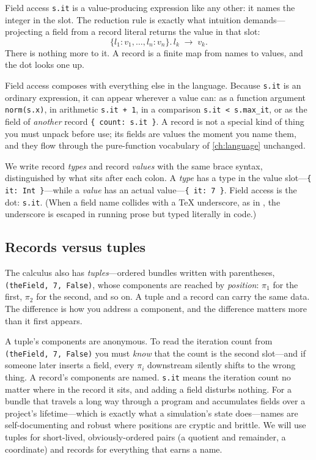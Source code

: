 Field access \lstinline[style=l4style]|s.it| is a value-producing expression
like any other: it names the integer in the  slot. The reduction rule
is exactly what intuition demands---projecting a field from a record literal
returns the value in that slot:
\[
  \{l_1\!:\!v_1,\dots,l_n\!:\!v_n\}.\,l_k \;\to\; v_k .
\]
There is nothing more to it. A record is a finite map from names to values, and
the dot looks one up.

Field access composes with everything else in the language. Because
\lstinline[style=l4style]|s.it| is an ordinary expression, it can appear wherever
a value can: as a function argument \lstinline[style=l4style]|norm(s.x)|, in
arithmetic \lstinline[style=l4style]|s.it + 1|, in a comparison
\lstinline[style=l4style]|s.it < s.max_it|, or as the field of \emph{another}
record \lstinline[style=l4style]|{ count: s.it }|. A record is not a special kind
of thing you must unpack before use; its fields are values the moment you name
them, and they flow through the pure-function vocabulary of \cref{ch:language}
unchanged.

\begin{notationbox}
We write record \emph{types} and record \emph{values} with the same brace
syntax, distinguished by what sits after each colon. A \emph{type} has a type in
the value slot---\lstinline[style=l4style]|{ it: Int }|---while a \emph{value}
has an actual value---\lstinline[style=l4style]|{ it: 7 }|. Field access is the
dot: \lstinline[style=l4style]|s.it|. (When a field name collides with a TeX
underscore, as in , the underscore is escaped in running prose
but typed literally in code.)
\end{notationbox}

\subsection{Records versus tuples}

The calculus also has \emph{tuples}---ordered bundles written with parentheses,
\lstinline[style=l4style]|(theField, 7, False)|, whose components are reached by
\emph{position}: $\pi_1$ for the first, $\pi_2$ for the second, and so on. A
tuple and a record can carry the same data. The difference is how you address a
component, and the difference matters more than it first appears.

A tuple's components are anonymous. To read the iteration count from
\lstinline[style=l4style]|(theField, 7, False)| you must \emph{know} that the
count is the second slot---and if someone later inserts a field, every
$\pi_i$ downstream silently shifts to the wrong thing. A record's components
are named. \lstinline[style=l4style]|s.it| means the iteration count no matter
where in the record it sits, and adding a field disturbs nothing. For a bundle
that travels a long way through a program and accumulates fields over a project's
lifetime---which is exactly what a simulation's state does---names are
self-documenting and robust where positions are cryptic and brittle. We will use
tuples for short-lived, obviously-ordered pairs (a quotient and remainder, a
coordinate) and records for everything that earns a name.


